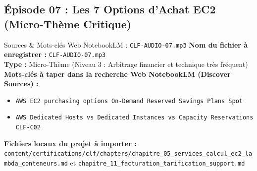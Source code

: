 \documentclass[11pt,a4paper]{article}
\begin{document}
\subsection{Épisode 07 : Les 7 Options d'Achat EC2 (Micro-Thème Critique)}
\begin{sourcebox}{Sources \& Mots-clés Web NotebookLM : \texttt{CLF-AUDIO-07.mp3}}
\textbf{Nom du fichier à enregistrer :} \texttt{CLF-AUDIO-07.mp3}\\
\textbf{Type :} Micro-Thème (Niveau 3 : Arbitrage financier et technique très fréquent)\\
\textbf{Mots-clés à taper dans la recherche Web NotebookLM (Discover Sources) :}
\begin{itemize}[noitemsep]
    \item \texttt{AWS EC2 purchasing options On-Demand Reserved Savings Plans Spot}
    \item \texttt{AWS Dedicated Hosts vs Dedicated Instances vs Capacity Reservations CLF-C02}
\end{itemize}
\textbf{Fichiers locaux du projet à importer :}
\texttt{content/certifications/clf/chapters/chapitre_05_services_calcul_ec2_lambda_conteneurs.md} et \texttt{chapitre_11_facturation_tarification_support.md}
\end{sourcebox}
\end{document}
